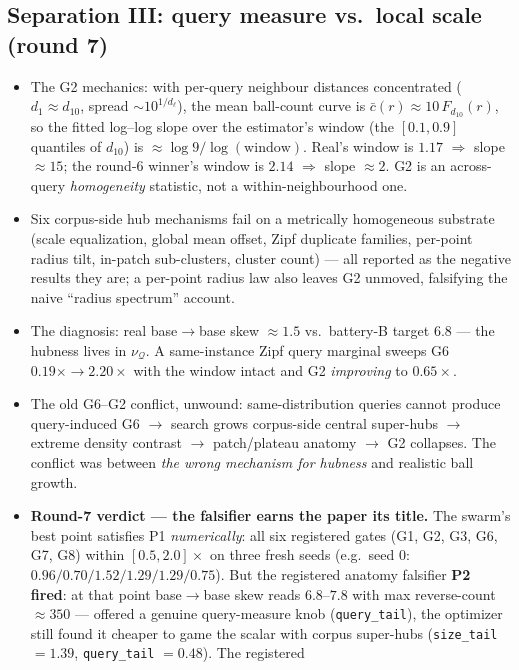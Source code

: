 \documentclass[11pt]{article}
\newcommand{\nuQ}{\nu_{\mathcal{Q}}}
\begin{document}
\subsection{Separation III: query measure vs.\ local scale (round 7)}
\label{sec:sep3}
\begin{itemize}
\item The G2 mechanics: with per-query neighbour distances concentrated
  ($d_1 \approx d_{10}$, spread $\sim 10^{1/d_\ell}$), the mean ball-count
  curve is $\bar c(r) \approx 10\,F_{d_{10}}(r)$, so the fitted log--log slope
  over the estimator's window (the $[0.1,0.9]$ quantiles of $d_{10}$) is
  $\approx \log 9 / \log(\mathrm{window})$. Real's window is $1.17$
  $\Rightarrow$ slope $\approx 15$; the round-6 winner's window is $2.14$
  $\Rightarrow$ slope $\approx 2$. G2 is an across-query \emph{homogeneity}
  statistic, not a within-neighbourhood one.
\item Six corpus-side hub mechanisms fail on a metrically homogeneous substrate
  (scale equalization, global mean offset, Zipf duplicate families, per-point
  radius tilt, in-patch sub-clusters, cluster count) --- all reported as the
  negative results they are; a per-point radius law also leaves G2 unmoved,
  falsifying the naive ``radius spectrum'' account.
\item The diagnosis: real base$\to$base skew $\approx1.5$ vs.\ battery-B target
  $6.8$ --- the hubness lives in $\nuQ$. A same-instance Zipf query marginal
  sweeps G6 $0.19\times \to 2.20\times$ with the window intact and G2
  \emph{improving} to $0.65\times$.
\item The old G6--G2 conflict, unwound: same-distribution queries cannot
  produce query-induced G6 $\to$ search grows corpus-side central super-hubs
  $\to$ extreme density contrast $\to$ patch/plateau anatomy $\to$ G2
  collapses. The conflict was between \emph{the wrong mechanism for hubness}
  and realistic ball growth.
\item \textbf{Round-7 verdict --- the falsifier earns the paper its title.}
  The swarm's best point satisfies P1 \emph{numerically}: all six registered
  gates (G1, G2, G3, G6, G7, G8) within $[0.5,2.0]\times$ on three fresh seeds
  (e.g.\ seed 0: $0.96/0.70/1.52/1.29/1.29/0.75$). But the registered anatomy
  falsifier \textbf{P2 fired}: at that point base$\to$base skew reads
  $6.8$--$7.8$ with max reverse-count $\approx 350$ --- offered a genuine
  query-measure knob (\texttt{query\_tail}), the optimizer still found it
  cheaper to game the scalar with corpus super-hubs
  (\texttt{size\_tail} $=1.39$, \texttt{query\_tail} $=0.48$). The registered

\end{itemize}
\end{document}
